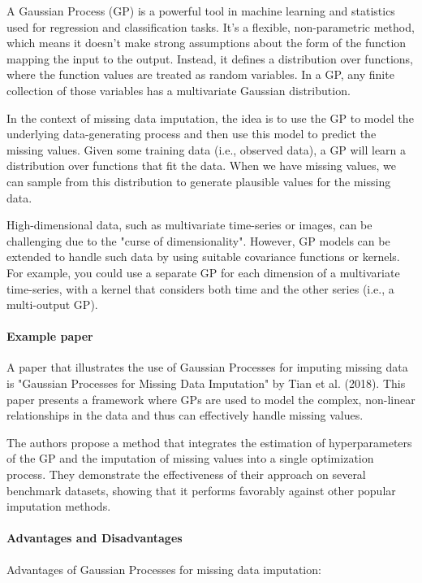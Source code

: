 \documentclass[a4paper,12pt,twoside,openright]{report}
\begin{document}
A Gaussian Process (GP) is a powerful tool in machine learning and statistics used for regression and classification tasks. It's a flexible, non-parametric method, which means it doesn't make strong assumptions about the form of the function mapping the input to the output. Instead, it defines a distribution over functions, where the function values are treated as random variables. In a GP, any finite collection of those variables has a multivariate Gaussian distribution.

In the context of missing data imputation, the idea is to use the GP to model the underlying data-generating process and then use this model to predict the missing values. Given some training data (i.e., observed data), a GP will learn a distribution over functions that fit the data. When we have missing values, we can sample from this distribution to generate plausible values for the missing data.

High-dimensional data, such as multivariate time-series or images, can be challenging due to the "curse of dimensionality". However, GP models can be extended to handle such data by using suitable covariance functions or kernels. For example, you could use a separate GP for each dimension of a multivariate time-series, with a kernel that considers both time and the other series (i.e., a multi-output GP).

\paragraph{Example paper} A paper that illustrates the use of Gaussian Processes for imputing missing data is "Gaussian Processes for Missing Data Imputation" by Tian et al. (2018). This paper presents a framework where GPs are used to model the complex, non-linear relationships in the data and thus can effectively handle missing values.

The authors propose a method that integrates the estimation of hyperparameters of the GP and the imputation of missing values into a single optimization process. They demonstrate the effectiveness of their approach on several benchmark datasets, showing that it performs favorably against other popular imputation methods.

\paragraph{Advantages and Disadvantages} Advantages of Gaussian Processes for missing data imputation:
\end{document}
